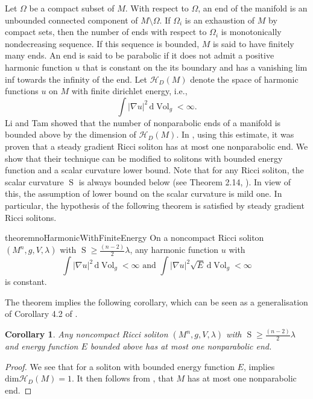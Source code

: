 \documentclass{amsart}
\newcommand{\abs}[1]{\left| #1 \right|}
\newcommand{\derivative}{\mathrm{d}}
\DeclareMathOperator*{\scalar}{S}
\DeclareMathOperator*{\Vol}{Vol}
\theoremstyle{plain}
\theoremstyle{plain}
\newtheorem{corollary}{Corollary}
\theoremstyle{plain}
\theoremstyle{plain}
\theoremstyle{remark}
\begin{document}
    Let $\Omega$ be a compact subset of $M$. With respect to $\Omega$, an end of the manifold is an unbounded connected component of $M\setminus \Omega$. 
    If $\Omega_i$ is an exhaustion of $M$ by compact sets, then the number of ends with respect to $\Omega_i$ is monotonically nondecreasing sequence. 
    If this sequence is bounded, $M$ is said to have finitely many ends.
    An end is said to be parabolic if it does not admit a positive harmonic function $u$ that is constant on the its boundary and has a vanishing lim inf towards the infinity of the end. 
    Let $\mathcal{H}_D (M) $ denote the space of harmonic functions $u$ on $M$ with finite dirichlet energy, i.e.,
    $$ \int \abs{\nabla u}^2 \, \derivative{\Vol}_g < \infty . $$
    Li and Tam \cite{MR1158340} showed that the number of nonparabolic ends of a manifold is bounded above by the dimension of $\mathcal{H}_D (M)$.
    In \cite{MR3023848}, using this estimate, it was proven that a steady gradient Ricci soliton has at most one nonparabolic end.
    We show that their technique can be modified to solitons with bounded energy function and a scalar curvature lower bound. 
    Note that for any Ricci soliton, the scalar curvature $\scalar$ is always bounded below (see Theorem 2.14, \cite{MR4624811}). 
    In view of this, the assumption of lower bound on the scalar curvature is mild one.
    In particular, the hypothesis of the following theorem is satisfied by steady gradient Ricci solitons.
    \begin{restatable}{theorem}{noHarmonicWithFiniteEnergy}
        \label{thm: no harmonic function with finite energy}
        On a noncompact Ricci soliton $(M^n, g, V, \lambda)$ with $\scalar \geq \frac{(n-2)}{2} \lambda $,
    	any harmonic function $u$ with
        \begin{equation}\label{eqn: finite dirichlet energy}
            \int \abs{\nabla u}^2  \, \derivative {\Vol}_g <\infty \text{ and } 
             \int \abs{\nabla u}^2 \sqrt{E} \, \derivative {\Vol}_g <\infty
        \end{equation}
        is constant.
    \end{restatable}
    The theorem implies the following corollary, which can be seen as a generalisation of Corollary 4.2 of \cite{MR3023848}.
    \begin{corollary}
        Any noncompact Ricci soliton $(M^n, g, V, \lambda)$ with $\scalar \geq \frac{(n-2)}{2} \lambda $ and energy function $E$ bounded above has at most one nonparabolic end.
    \end{corollary}
    \begin{proof}
        We see that for a soliton with bounded energy function $E$,  implies $\mathrm{dim} \mathcal{H}_D (M) = 1 $. 
        It then follows from \cite{MR1158340}, that $M$ has at most one nonparabolic end.
    \end{proof}
\end{document}
